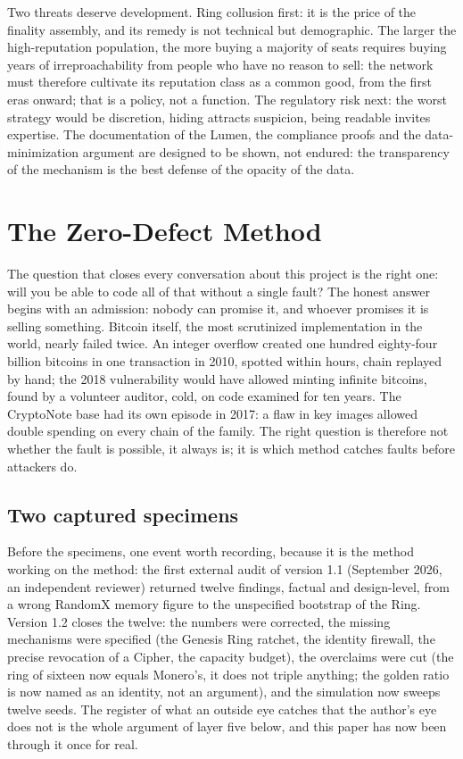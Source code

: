 Two threats deserve development. Ring collusion first: it is the price
of the finality assembly, and its remedy is not technical but
demographic. The larger the high-reputation population, the more buying a
majority of seats requires buying years of irreproachability from people
who have no reason to sell: the network must therefore cultivate its
reputation class as a common good, from the first eras onward; that is a
policy, not a function. The regulatory risk next: the worst strategy
would be discretion, hiding attracts suspicion, being readable invites
expertise. The documentation of the Lumen, the compliance proofs and the
data-minimization argument are designed to be shown, not endured: the
transparency of the mechanism is the best defense of the opacity of the
data.

\section{The Zero-Defect Method}\label{sec:method}

The question that closes every conversation about this project is the
right one: will you be able to code all of that without a single fault?
The honest answer begins with an admission: nobody can promise it, and
whoever promises it is selling something. Bitcoin itself, the most
scrutinized implementation in the world, nearly failed twice. An integer
overflow created one hundred eighty-four billion bitcoins in one
transaction in 2010, spotted within hours, chain replayed by hand; the
2018 vulnerability would have allowed minting infinite bitcoins, found
by a volunteer auditor, cold, on code examined for ten years. The
CryptoNote base had its own episode in 2017: a flaw in key images
allowed double spending on every chain of the family. The right question
is therefore not whether the fault is possible, it always is; it is
which method catches faults before attackers do.

\subsection{Two captured specimens}

Before the specimens, one event worth recording, because it is the
method working on the method: the first external audit of version 1.1
(September 2026, an independent reviewer) returned twelve findings,
factual and design-level, from a wrong RandomX memory figure to the
unspecified bootstrap of the Ring. Version 1.2 closes the twelve: the
numbers were corrected, the missing mechanisms were specified (the
Genesis Ring ratchet, the identity firewall, the precise revocation of
a Cipher, the capacity budget), the overclaims were cut (the ring of
sixteen now equals Monero's, it does not triple anything; the golden
ratio is now named as an identity, not an argument), and the simulation
now sweeps twelve seeds. The register of what an outside eye catches
that the author's eye does not is the whole argument of layer five
below, and this paper has now been through it once for real.

